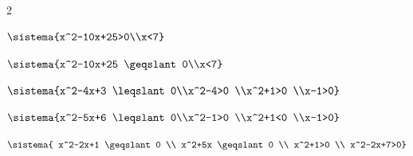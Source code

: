 \begin{esercizio}[*]
\begin{htmulticols}{2}
\begin{enumeratea}
\sol{\emptyset}
\item \(\sistema{x^2-10x+25>0\\x<7}\)
\item \(\sistema{x^2-10x+25 \geqslant 0\\x<7}\)
\item \(\sistema{x^2-4x+3 \leqslant 0\\x^2-4>0 \\x^2+1>0 \\x-1>0}\)
\item \(\sistema{x^2-5x+6 \leqslant 0\\x^2-1>0 \\x^2+1<0 \\x-1>0}\)
\sol{\emptyset}
\item \(\sistema{
  x^2-2x+1 \geqslant 0 \\
  x^2+5x \geqslant 0 \\
  x^2+1>0 \\
  x^2-2x+7>0}\)
\end{enumeratea}
\end{htmulticols}
\end{esercizio}


